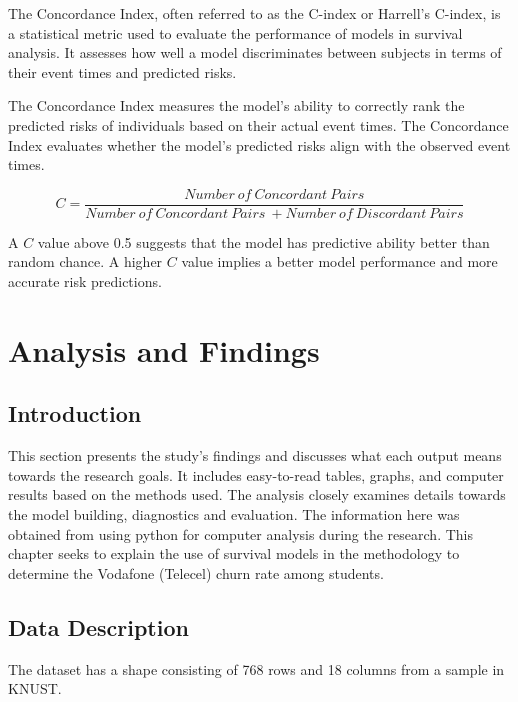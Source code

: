 \documentclass[doublespacing]{report} %
\begin{document}
The Concordance Index, often referred to as the C-index or Harrell's C-index, is a statistical metric used to evaluate the performance of models in survival analysis. It assesses how well a model discriminates between subjects in terms of their event times and predicted risks. 

The Concordance Index measures the model's ability to correctly rank the predicted risks of individuals based on their actual event times. The Concordance Index evaluates whether the model's predicted risks align with the observed event times.

\[C=\frac{Number\ of\ Concordant\ Pairs}{Number\ of\ Concordant\ Pairs\ +Number\ of\ Discordant\ Pairs}\]

A \(C\) value above 0.5 suggests that the model has predictive ability better than random chance. A higher \(C\) value implies a better model performance and more accurate risk predictions.



\newpage
\chapter{Analysis and Findings}
\section{Introduction}

This section presents the study's findings and discusses what each output means towards the research goals. It includes easy-to-read tables, graphs, and computer results based on the methods used. The analysis closely examines details towards the model building, diagnostics and evaluation. The information here was obtained from using python for computer analysis during the research. This chapter seeks to explain the use of survival models in the methodology to determine the Vodafone (Telecel) churn rate among students.

\section{Data Description}

The dataset has a shape consisting of 768 rows and 18 columns from a sample in KNUST.
\end{document}
